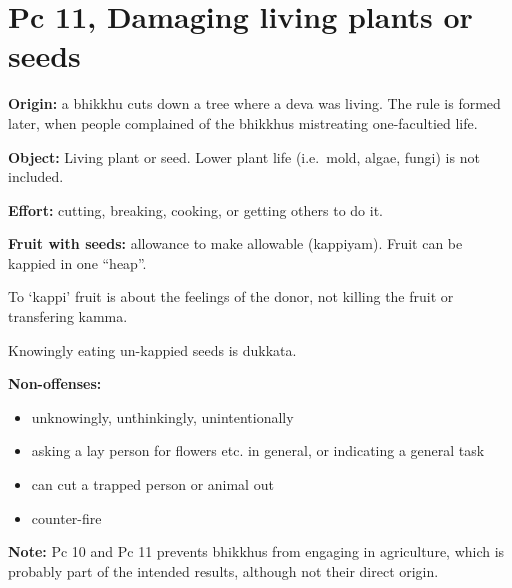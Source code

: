 \section{Pc 11, Damaging living plants or seeds}

\begin{multicols}{2}

\textbf{Origin:} a bhikkhu cuts down a tree where a deva was living. The
rule is formed later, when people complained of the bhikkhus mistreating
one-facultied life.

\textbf{Object:} Living plant or seed. Lower plant life (i.e.~mold,
algae, fungi) is not included.

\textbf{Effort:} cutting, breaking, cooking, or getting others to do it.

\textbf{Fruit with seeds:} allowance to make allowable (kappiyam). Fruit
can be kappied in one ``heap''.

To `kappi' fruit is about the feelings of the donor, not killing the
fruit or transfering kamma.

Knowingly eating un-kappied seeds is dukkata.

\textbf{Non-offenses:}

\begin{itemize}
\tightlist
\item
  unknowingly, unthinkingly, unintentionally
\item
  asking a lay person for flowers etc. in general, or indicating a
  general task
\item
  can cut a trapped person or animal out
\item
  counter-fire
\end{itemize}

\textbf{Note:} Pc 10 and Pc 11 prevents bhikkhus from engaging in
agriculture, which is probably part of the intended results, although
not their direct origin.

\end{multicols}

